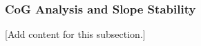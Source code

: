 
\subsubsection{CoG Analysis and Slope Stability}
\label{subsubsec:design_3_2_cog_slope_stability}

[Add content for this subsection.]
